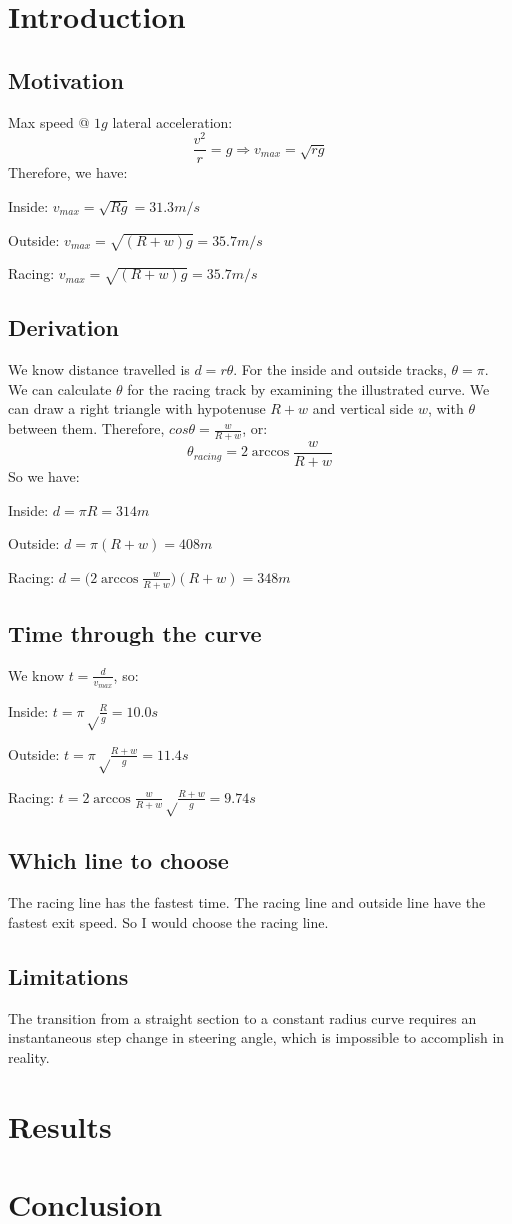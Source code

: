 \documentclass{article}
\begin{document}
\section{Introduction}
\subsection{Motivation}
Max speed @ $1g$ lateral acceleration:
$$\frac{v^2}{r} = g \Rightarrow v_{max} = \sqrt{rg}$$
Therefore, we have:

Inside: $v_{max} = \sqrt{Rg} = 31.3m/s$

Outside: $v_{max} = \sqrt{(R+w)g} = 35.7m/s$

Racing: $v_{max} =\sqrt{(R+w)g} = 35.7m/s$

\subsection{Derivation}
We know distance travelled is $d = r\theta$.  For the inside and outside tracks, $\theta = \pi$.
We can calculate $\theta$ for the racing track by examining the illustrated curve.
We can draw a right triangle with hypotenuse $R+w$ and vertical side $w$, with $\theta$ between them.
Therefore, $cos\theta = \frac{w}{R+w}$, or:
$$\theta_{racing} = 2\arccos{\frac{w}{R+w}}$$
So we have:

Inside: $d = {\pi}R = 314m$

Outside: $d = {\pi}(R+w) = 408m$

Racing: $d = {(2\arccos{\frac{w}{R+w}}})(R+w) = 348m$

\subsection{Time through the curve}
We know $t = \frac{d}{v_{max}}$, so:

Inside: $t = {\pi}\sqrt\frac{R}{g} = 10.0s$

Outside: $t = {\pi}\sqrt\frac{R+w}{g} = 11.4s$

Racing: $t = 2\arccos{\frac{w}{R+w}}\sqrt\frac{R+w}{g} = 9.74s$

\subsection{Which line to choose}
The racing line has the fastest time.  The racing line and outside line have the fastest exit speed.
So I would choose the racing line.

\subsection{Limitations}
The transition from a straight section to a constant radius curve requires an instantaneous step change in steering angle,
which is impossible to accomplish in reality.

\section{Results}

\section{Conclusion}
\end{document}

